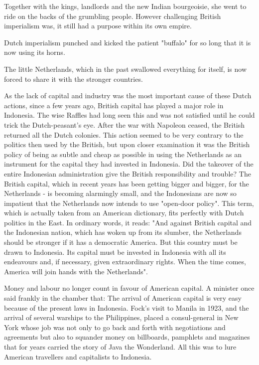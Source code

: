 Together with the kings, landlords and the new Indian bourgeoisie, she went to 
ride on the backs of the grumbling people. However challenging British imperialism was,
it still had a purpose within its own empire.\nline

Dutch imperialism punched and kicked the patient "buffalo" for so long that it is now using its horns.\nline

The little Netherlands, which in the past swallowed everything for itself, is now forced to share it with the stronger countries.\nline

As the lack of capital and industry was the most important cause of these Dutch actions, 
since a few years ago, British capital has played a major role in Indonesia. 
The wise Raffles had long seen this and was not satisfied until he could trick the Dutch-peasant's eye. 
After the war with Napoleon ceased, the British returned all the Dutch colonies. This action seemed to be very 
contrary to the politics then used by the British, but upon closer examination it was the British policy of being 
as subtle and cheap as possible in using the Netherlands as an instrument for the capital they had invested in 
Indonesia. Did the takeover of the entire Indonesian administration give the British responsibility and trouble? 
The British capital, which in recent years has been getting bigger and bigger, for the Netherlands - 
is becoming alarmingly small, and the Indonesians are now so impatient that the Netherlands now intends 
to use "open-door policy". This term, which is actually taken from an American dictionary, fits perfectly 
with Dutch politics in the East. In ordinary words, it reads: "And against British capital and the Indonesian 
nation, which has woken up from its slumber, the Netherlands should be stronger if it has a democratic America. 
But this country must be drawn to Indonesia. Its capital must be invested in Indonesia with all its endeavours and, 
if necessary, given extraordinary rights. When the time comes, America will join hands with the Netherlands".\nline

Money and labour no longer count in favour of American capital. 
A minister once said frankly in the chamber that: The arrival of American capital is very easy because of 
the present laws in Indonesia. Fock's visit to Manila in 1923, and the arrival of several warships to the
Philippines, placed a consul-general in New York whose job was not only to go back and forth with negotiations 
and agreements but also to squander money on billboards, pamphlets and magazines that for years carried the story 
of Java the Wonderland. All this was to lure American travellers and capitalists to Indonesia.\nline

